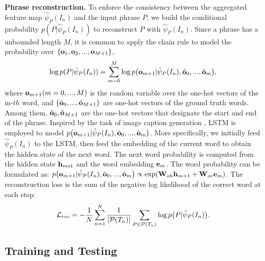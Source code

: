 \documentclass[runningheads]{llncs}
\begin{document}
\noindent \textbf{Phrase reconstruction.}  To enforce the consistency between the aggregated feature map  $ \hat{\psi}_{P}(I_{n})$ and the input phrase $P$, we build the conditional probability $p(P| \hat{\psi}_{P}(I_{n}))$ to reconstruct $P$ with $ \hat{\psi}_{P}(I_{n})$. Since a phrase has a unbounded length $M$, it is common to apply the chain rule to model the probability over $\{\bold{o}_{1}, \bold{o}_{2}, ..., \bold{o}_{M+1} \}$,
\begin{equation} \small
  \log p(P|\hat{\psi}_{P}(I_{n})) = \sum_{m=0}^{M} \log p\big(\bold{o}_{m+1}| \hat{\psi}_{P}(I_{n}), \hat{\bold{o}}_{0},..., \hat{\bold{o}}_{m}\big),
\end{equation}
where $\bold{o}_{m+1}(m=0,...,M)$ is the random variable over the one-hot vectors of the m-$th$ word, and $\{\hat{\bold{o}}_{0},...,\hat{\bold{o}}_{M+1}\}$ are one-hot vectors of the ground truth words. Among them, $\hat{\bold{o}}_{0},\hat{\bold{o}}_{M+1}$ are the one-hot vectors that designate the start and end of the phrase. Inspired by the task of image caption generation \cite{vinyals2015show, xu2015show}, LSTM is employed to model $ p \big(\bold{o}_{m+1}| \hat{\psi}_{P}(I_{n}), \hat{\bold{o}}_{0},..., \hat{\bold{o}}_{m} \big)$. More specifically, we initially feed $\hat{\psi}_{P}(I_{n})$ to the LSTM, then feed the embedding of the current word to obtain the hidden state of the next word. The next word probability is computed from the hidden state $\bold{h}_{m\!+\!1}$ and the word embedding $\bold{e}_{m}$. The word probability can be formulated as: $p\big( \bold{o}_{m+1}| \hat{\psi}_{P}(I_{n}), \hat{\bold{o}}_{0},..., \hat{\bold{o}}_{m} \big) \propto \exp(\bold{W}_{oh}\bold{h}_{m+1} + \bold{W}_{oe}\bold{e}_{m})$. The reconstruction loss is the sum of the negative log likelihood of the correct word at each step:
\begin{equation} \small
    \mathcal{L}_{rec} = -\frac{1}{N}\sum_{n=1}^{N} \frac{1}{|\mathcal{P}(T_{n})|}\sum_{P\in \mathcal{P}(T_{n})} \log p\big(P| \hat{\psi}_{P}(I_{n})\big). \label{Eqn:rec}
\end{equation}

\subsection{Training and Testing}
\end{document}
